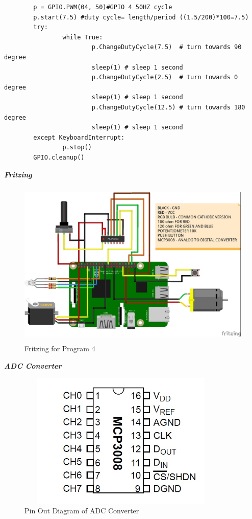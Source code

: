 \documentclass[12pt,a4paper]{article}
\begin{document}
\begin{flushleft}
 \begin{lstlisting}
        p = GPIO.PWM(04, 50)#GPIO 4 50HZ cycle
        p.start(7.5) #duty cycle= length/period ((1.5/200)*100=7.5)
        try:
                while True:
                        p.ChangeDutyCycle(7.5)  # turn towards 90 degree
                        sleep(1) # sleep 1 second
                        p.ChangeDutyCycle(2.5)  # turn towards 0 degree
                        sleep(1) # sleep 1 second
                        p.ChangeDutyCycle(12.5) # turn towards 180 degree
                        sleep(1) # sleep 1 second
        except KeyboardInterrupt:
                p.stop()
        GPIO.cleanup()
\end{lstlisting}
\textbf{\textit{Fritzing}} \\
\begin{figure}[h!]
    \centering
	\includegraphics[width=15cm, height=8cm]{Prog4.jpg}
	\caption{Fritzing for Program 4}
\end{figure}
\textbf{\textit{ADC Converter}} \\
\begin{figure}[h!]
    \centering
	\includegraphics[width=10cm, height=6.5cm]{Lab4_ADC.jpg}
	\caption{Pin Out Diagram of ADC Converter}
\end{figure}
\end{flushleft}\vspace{6.5cm}
\end{document}
